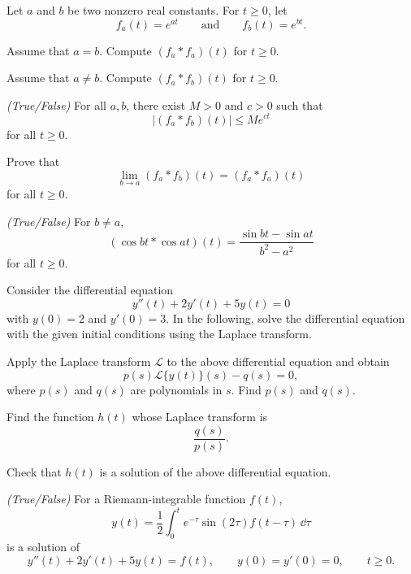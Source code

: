 \documentclass[11pt,oneside]{article}
\begin{document}
\begin{problem}
Let $a$ and $b$ be two nonzero real constants. For $t\ge0$, let
\[
f_a(t)=e^{at}
\qquad\text{and}\qquad
f_b(t)=e^{bt}.
\]
\begin{problemsubparts}
\item Assume that $a=b$. Compute $(f_a\ast f_a)(t)$ for $t\ge0$.
\item Assume that $a\ne b$. Compute $(f_a\ast f_b)(t)$ for $t\ge0$.
\item \textit{(True/False)} For all $a,b$, there exist $M>0$ and $c>0$ such that
\[
\bigl|(f_a\ast f_b)(t)\bigr|\le Me^{ct}
\]
for all $t\ge0$.
\item Prove that
\[
\lim_{b\to a}(f_a\ast f_b)(t)=(f_a\ast f_a)(t)
\]
for all $t\ge0$.
\item \textit{(True/False)} For $b\ne a$,
\[
(\cos bt\ast\cos at)(t)=\frac{\sin bt-\sin at}{b^2-a^2}
\]
for all $t\ge0$.
\end{problemsubparts}
\end{problem}

\begin{problem}
Consider the differential equation
\[
y''(t)+2y'(t)+5y(t)=0
\]
with $y(0)=2$ and $y'(0)=3$. In the following, solve the differential equation with the given initial conditions using the Laplace transform.
\begin{problemsubparts}
\item Apply the Laplace transform $\mathcal{L}$ to the above differential equation and obtain
\[
p(s)\mathcal{L}\{y(t)\}(s)-q(s)=0,
\]
where $p(s)$ and $q(s)$ are polynomials in $s$. Find $p(s)$ and $q(s)$.
\item Find the function $h(t)$ whose Laplace transform is
\[
\frac{q(s)}{p(s)}.
\]
\item Check that $h(t)$ is a solution of the above differential equation.
\item \textit{(True/False)} For a Riemann-integrable function $f(t)$,
\[
y(t)=\frac12\int_0^t e^{-\tau}\sin(2\tau)f(t-\tau)\,\dd\tau
\]
is a solution of
\[
y''(t)+2y'(t)+5y(t)=f(t),
\qquad
y(0)=y'(0)=0,
\qquad t\ge0.
\]
\end{problemsubparts}
\end{problem}
\end{document}
